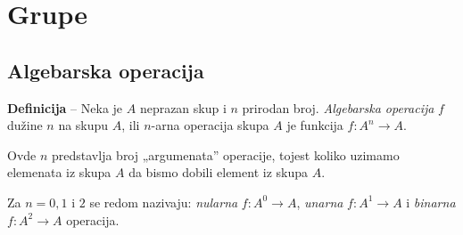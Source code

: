 \documentclass[a4paper,12pt]{article}
\begin{document}
\section{Grupe}


\subsection{Algebarska operacija}

\textbf{Definicija} -- Neka je \(A\) neprazan skup i \(n\) prirodan broj.
\emph{Algebarska operacija} \(f\) dužine \(n\) na skupu \(A\), ili \(n\)-arna
operacija skupa \(A\) je funkcija \( f : A^n \rightarrow A \).

Ovde \( n \) predstavlja broj „argumenata” operacije, tojest koliko uzimamo elemenata iz skupa \( A \) da bismo dobili element iz skupa \( A \).

Za \(n = 0, 1\) i \(2\) se redom nazivaju: \emph{nularna} \(f:A^0 \rightarrow A\), \emph{unarna} \(f:A^1 \rightarrow A\) i \emph{binarna} \(f:A^2 \rightarrow A\) operacija.
\end{document}
